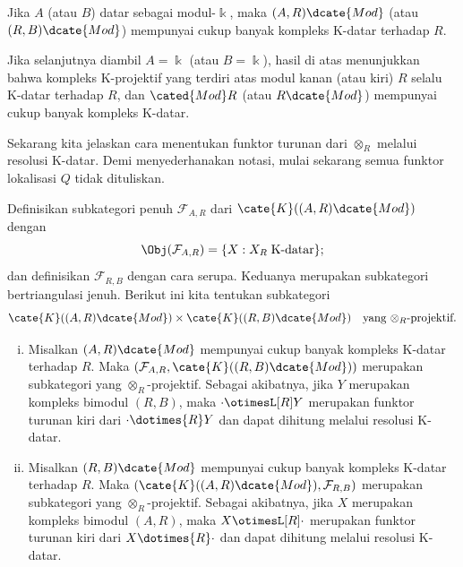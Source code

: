 \begin{korolari}\label{prop:enough-K-flat}
	Jika $A$ (atau $B$) datar sebagai modul-$\Bbbk$, maka
	$(A,R)\dcate{Mod}$ (atau $(R,B)\dcate{Mod}$) mempunyai cukup banyak
	kompleks K-datar terhadap $R$.
\end{korolari}

Jika selanjutnya diambil $A=\Bbbk$ (atau $B=\Bbbk$), hasil di atas menunjukkan
bahwa kompleks K-projektif yang terdiri atas modul kanan (atau kiri) $R$ selalu
K-datar terhadap $R$, dan $\cated{Mod}R$ (atau $R\dcate{Mod}$) mempunyai cukup
banyak kompleks K-datar.

Sekarang kita jelaskan cara menentukan funktor turunan dari $\otimes_R$ melalui
resolusi K-datar. Demi menyederhanakan notasi, mulai sekarang semua funktor
lokalisasi $Q$ tidak dituliskan.

\begin{proposisi}\label{prop:K-flat}
	Definisikan subkategori penuh $\mathcal{F}_{A,R}$ dari
	$\cate{K}((A,R)\dcate{Mod})$ dengan
	\[ \Obj(\mathcal{F}_{A,R}) = \{ X: X_R \;\text{K-datar} \}; \]
	dan definisikan $\mathcal{F}_{R,B}$ dengan cara serupa. Keduanya merupakan
	subkategori bertriangulasi jenuh. Berikut ini kita tentukan subkategori
	\[ \cate{K}((A,R)\dcate{Mod}) \times \cate{K}((R,B)\dcate{Mod}) \quad \text{yang $\otimes_R$-projektif}. \]
	\begin{enumerate}[(i)]
		\item Misalkan $(A,R)\dcate{Mod}$ mempunyai cukup banyak kompleks K-datar
		terhadap $R$. Maka
		$\left(\mathcal{F}_{A,R},\cate{K}((R,B)\dcate{Mod})\right)$ merupakan
		subkategori yang $\otimes_R$-projektif. Sebagai akibatnya, jika $Y$
		merupakan kompleks bimodul $(R,B)$, maka $\cdot\otimesL[R]Y$ merupakan
		funktor turunan kiri dari $\cdot\dotimes{R}Y$ dan dapat dihitung melalui
		resolusi K-datar.

		\item Misalkan $(R,B)\dcate{Mod}$ mempunyai cukup banyak kompleks K-datar
		terhadap $R$. Maka
		$(\cate{K}((A,R)\dcate{Mod}),\mathcal{F}_{R,B})$ merupakan subkategori
		yang $\otimes_R$-projektif. Sebagai akibatnya, jika $X$ merupakan kompleks
		bimodul $(A,R)$, maka $X\otimesL[R]\cdot$ merupakan funktor turunan kiri
		dari $X\dotimes{R}\cdot$ dan dapat dihitung melalui resolusi K-datar.
	\end{enumerate}
\end{proposisi}

